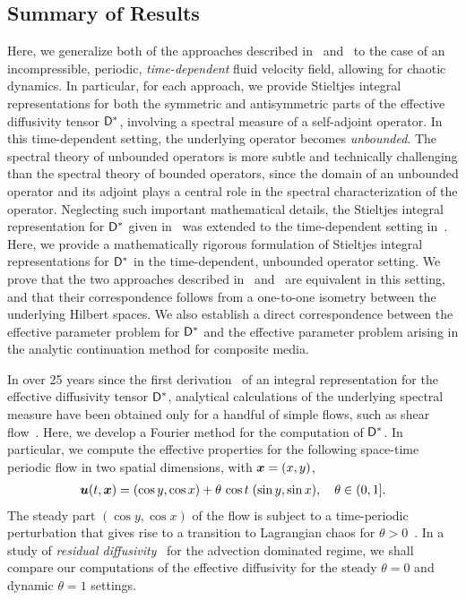 \documentclass[amsa]{ipart}
\begin{document}
\subsection{Summary of Results}
%
Here, we generalize both of the approaches described
in~\cite{Avellaneda:PRL-753,Avellaneda:CMP-339}
and~\cite{Pavliotis:PHD_Thesis} to the case of an incompressible,
periodic, \emph{time-dependent} fluid velocity field, allowing for
chaotic dynamics. In particular, for each approach, we provide Stieltjes
integral representations for both the symmetric and antisymmetric
parts of the effective diffusivity tensor $\mathsf{D}^*$, involving a
spectral measure of a self-adjoint operator. In this time-dependent
setting, the underlying operator becomes \emph{unbounded}. The
spectral theory of unbounded operators is more subtle and technically
challenging than the spectral theory of bounded operators, since the
domain of an unbounded operator and its adjoint plays a central role
in the 
spectral characterization of the operator. Neglecting such important 
mathematical details, the Stieltjes integral representation for
$\mathsf{D}^*$ given in~\cite{Avellaneda:PRL-753,Avellaneda:CMP-339} was
extended to the time-dependent setting
in~\cite{Avellaneda:PRE:3249}. Here, we provide a mathematically 
rigorous formulation of Stieltjes integral representations for $\mathsf{D}^*$
in the time-dependent, unbounded operator setting. We prove that the
two approaches described
in~\cite{Avellaneda:PRL-753,Avellaneda:CMP-339}
and~\cite{Pavliotis:PHD_Thesis} are equivalent in this setting, and
that their correspondence follows from a one-to-one isometry between
the underlying Hilbert spaces. We also establish a direct
correspondence between the effective parameter problem for $\mathsf{D}^*$ and
the effective parameter problem arising in the analytic continuation
method for composite media.  






In over 25 years since the first derivation~\cite{Avellaneda:PRL-753}
of an integral representation for the effective diffusivity tensor
$\mathsf{D}^*$, analytical calculations of the underlying spectral measure
have been obtained only for a handful of simple flows, such as
shear flow~\cite{Avellaneda:CMP-339}. Here, we develop a  
Fourier method for the computation of $\mathsf{D}^*$. In particular, we 
compute the effective properties for the following space-time periodic 
flow in two spatial dimensions, with $\boldsymbol{x}=(x,y)$,
%
\begin{align}\label{eq:tdcell}
\vecu (t,\vecx)=(\cos{y},\cos{x}) + \theta\,\cos{t}\;(\sin{y},\sin{x}), 
\quad
\theta \in (0,1].
\end{align}
%
The steady part $(\cos{y}, \cos{x})$ of the flow is subject to a
time-periodic perturbation that gives rise to a transition to
Lagrangian chaos for $\theta>0$~\cite{Biferale:PF:2725,ZCX_2015}. In a
study of \emph{residual
  diffusivity}~\cite{Biferale:PF:2725,ZCX_2015} for the advection 
dominated regime, we shall compare our computations of the effective
diffusivity for the steady $\theta=0$ and dynamic $\theta=1$ settings.   
\end{document}
